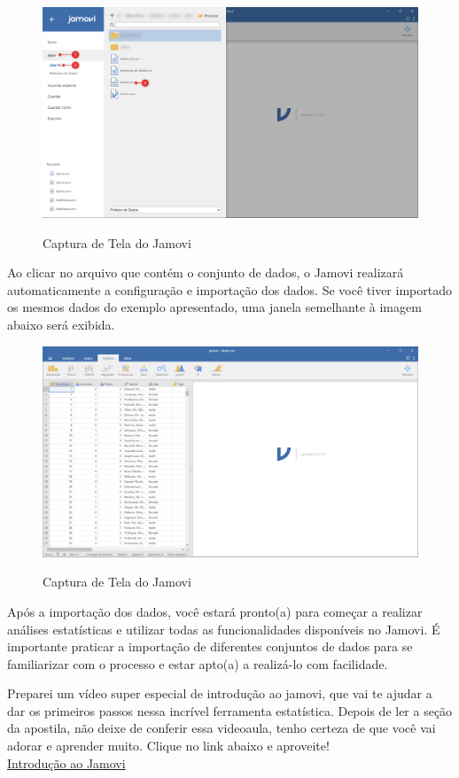 \begin{figure}[H]
  \centering
  \caption{Captura de Tela do Jamovi}
  \includegraphics[width=\textwidth]{imagens/cap_1/importa_dados_2.png}
  \label{fig:importa_dados_2}
\end{figure}

Ao clicar no arquivo que contém o conjunto de dados, o Jamovi realizará automaticamente a configuração e importação dos dados. Se você tiver importado os mesmos dados do exemplo apresentado, uma janela semelhante à imagem abaixo será exibida.

\begin{figure}[H]
  \centering
  \caption{Captura de Tela do Jamovi}
  \includegraphics[width=\textwidth]{imagens/cap_1/jamovi_arquivo_importado.png}
  \label{fig:jamovi_arquivo_importado}
\end{figure}

Após a importação dos dados, você estará pronto(a) para começar a realizar análises estatísticas e utilizar todas as funcionalidades disponíveis no Jamovi. É importante praticar a importação de diferentes conjuntos de dados para se familiarizar com o processo e estar apto(a) a realizá-lo com facilidade.

\begin{tcolorbox}[colback=green!10!white,colframe=green!50!black,title= Dica de Conteúdo]
  Preparei um vídeo super especial de introdução ao jamovi, que vai te ajudar a dar os primeiros passos nessa incrível ferramenta estatística. Depois de ler a seção da apostila, não deixe de conferir essa videoaula, tenho certeza de que você vai adorar e aprender muito. Clique no link abaixo e aproveite!\\
  \faYoutube{} \href{https://www.youtube.com/watch?v=0zGH20Fa_JA&t=2s}{Introdução ao Jamovi}
\end{tcolorbox}